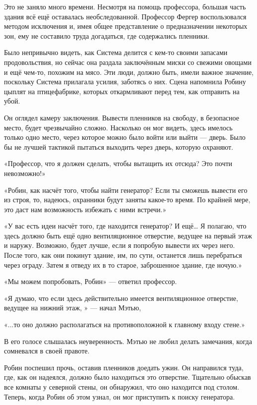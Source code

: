 \documentclass[a5paper, 9pt,
final, openany, twoside=true]{memoir}
\begin{document}
Это не заняло много времени. Несмотря на помощь профессора, большая часть здания всё ещё оставалась необследованной. Профессор Фергер воспользовался методом исключения и, имея общее представление о предназначении некоторых зон, ему не составило труда догадаться, где содержались пленники.

Было непривычно видеть, как Система делится с кем-то своими запасами продовольствия, но сейчас она раздала заключённым миски со свежими овощами и ещё чем-то, похожим на мясо. Эти люди, должно быть, имели важное значение, поскольку Система прилагала усилия, заботясь о них. Сцена напомнила Робину цыплят на птицефабрике, которых откармливают перед тем, как отправить на убой.

Он оглядел камеру заключения. Вывести пленников на свободу, в безопасное место, будет чрезвычайно сложно. Насколько он мог видеть, здесь имелось только одно место, через которое можно было войти или выйти — дверь. Было бы не лучшей тактикой пытаться выходить через дверь, которую охраняют.

«Профессор, что я должен сделать, чтобы вытащить их отсюда? Это почти невозможно!»

«Робин, как насчёт того, чтобы найти генератор? Если ты сможешь вывести его из строя, то, надеюсь, охранники будут заняты какое-то время. По крайней мере, это даст нам возможность избежать с ними встречи.»

«У вас есть идеи насчёт того, где находится генератор? И ещё… Я полагаю, что здесь должно быть ещё одно вентиляционное отверстие, ведущее на первый этаж и наружу. Возможно, будет лучше, если я попробую вывести их через него. После того, как они покинут здание, им, по сути, останется лишь перебраться через ограду. Затем я отведу их в то старое, заброшенное здание, где ночую.»

«Мы можем попробовать, Робин» — ответил профессор.

«Я думаю, что если здесь действительно имеется вентиляционное отверстие, ведущее на нижний этаж, » — начал Мэтью,

«...то оно должно располагаться на противоположной к главному входу стене.»

В его голосе слышалась неуверенность. Мэтью не любил делать замечания, когда сомневался в своей правоте.

Робин поспешил прочь, оставив пленников доедать ужин. Он направился туда, где, как он надеялся, должно было находиться это отверстие. Тщательно обыскав все комнаты у северной стены, он обнаружил, что оно находится под столом. Теперь, когда Робин об этом узнал, он мог приступить к поиску генератора.
\end{document}
